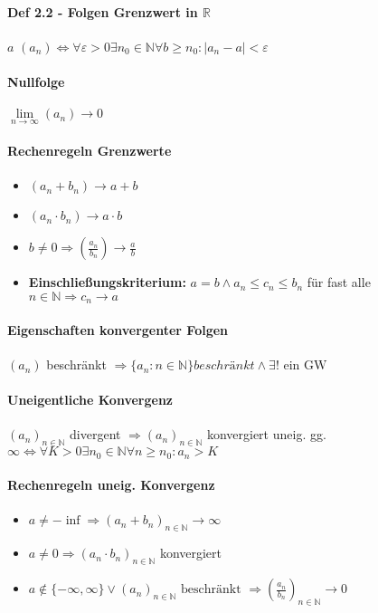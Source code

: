 \documentclass[paper=a3,paper=landscape, fontsize=9pt,DIV=25]{scrartcl}
\newcommand{\real}{{\mathbb{R}}}
\newcommand{\nat}{\mathbb{N}}
\newcommand{\aseq}{(a_n)_{n \in \nat}}
\begin{document}
\begin{multicols*}{4}
		\paragraph{Def 2.2 - Folgen Grenzwert in $\real$}
		$a$  $ (a_n) \Leftrightarrow \forall \varepsilon > 0 \exists n_0 \in \nat \forall b \geq n_0 : |a_n - a| < \varepsilon$
		\paragraph{Nullfolge}
		$\lim\limits_{n \rightarrow \infty} (a_n) \rightarrow 0$
		\paragraph{Rechenregeln Grenzwerte}
			\begin{itemize}
				\item $(a_n+b_n) \rightarrow a+b$
				\item $(a_n \cdot b_n) \rightarrow a \cdot b$
				\item $b \neq 0 \Rightarrow (\frac{a_n}{b_n}) \rightarrow \frac{a}{b}$
				\item \textbf{Einschließungskriterium:} $a=b \wedge a_n \leq c_n \leq b_n$ für fast alle $n \in \nat \Rightarrow c_n \rightarrow a$
			\end{itemize}
		\paragraph{Eigenschaften konvergenter Folgen}
		$(a_n)$ beschränkt $\Rightarrow \{a_n : n \in \nat\} beschränkt \wedge \exists! \text{ ein GW}$
		\paragraph{Uneigentliche Konvergenz}
		$\aseq$ divergent $\Rightarrow\aseq$ konvergiert uneig. gg. $\infty \Leftrightarrow \forall K > 0 \exists n_0 \in \nat \forall n \geq n_0: a_n > K$
		\paragraph{Rechenregeln uneig. Konvergenz}
			\begin{itemize}
				\item $a \neq -\inf \Rightarrow (a_n+b_n)_{n \in \nat} \rightarrow \infty$
				\item $a \neq 0 \Rightarrow (a_n \cdot b_n)_{n \in \nat}$ konvergiert
				\item $a \notin \{-\infty, \infty\} \vee\aseq \text{ beschränkt } \Rightarrow (\frac{a_n}{b_n})_{n \in \nat} \rightarrow 0$
			\end{itemize}

\end{multicols*}
\end{document}
